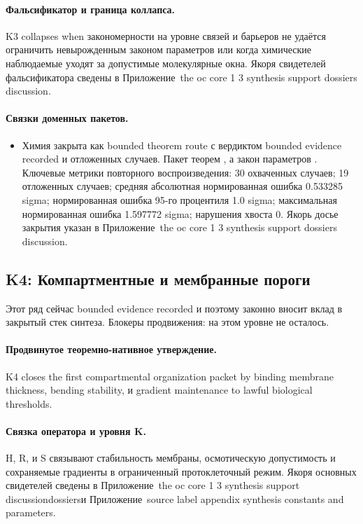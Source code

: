 \paragraph{Фальсификатор и граница коллапса.}
K3 collapses when закономерности на уровне связей и барьеров не удаётся ограничить невырожденным законом параметров или когда химические наблюдаемые уходят за допустимые молекулярные окна.
Якоря свидетелей фальсификатора сведены в Приложение~the oc core 1 3 synthesis support dossiers discussion.

\paragraph{Связки доменных пакетов.}
\begin{itemize}[leftmargin=1.6em,nosep]
\item Химия закрыта как bounded theorem route с вердиктом bounded evidence recorded и  отложенных случаев. Пакет теорем , а закон параметров . Ключевые метрики повторного воспроизведения: 30 охваченных случаев; 19 отложенных случаев; средняя абсолютная нормированная ошибка 0.533285 sigma; нормированная ошибка 95-го процентиля 1.0 sigma; максимальная нормированная ошибка 1.597772 sigma; нарушения хвоста 0. Якорь досье закрытия указан в Приложение~the oc core 1 3 synthesis support dossiers discussion.
\end{itemize}

\subsection{K4: Компартментные и мембранные пороги}
\label{sec:oc-core-1-3-synthesis-k4}
Этот ряд сейчас bounded evidence recorded и поэтому законно вносит вклад в закрытый стек синтеза.
Блокеры продвижения: на этом уровне не осталось.

\paragraph{Продвинутое теоремно-нативное утверждение.}
K4 closes the first compartmental organization packet by binding membrane thickness, bending stability, и gradient maintenance to lawful biological thresholds.

\paragraph{Связка оператора и уровня K.}
H, R, и S связывают стабильность мембраны, осмотическую допустимость и сохраняемые градиенты в ограниченный протоклеточный режим.
Якоря основных свидетелей сведены в Приложение~the oc core 1 3 synthesis support discussiondossiersи Приложение~source label appendix synthesis constants and parameters.

